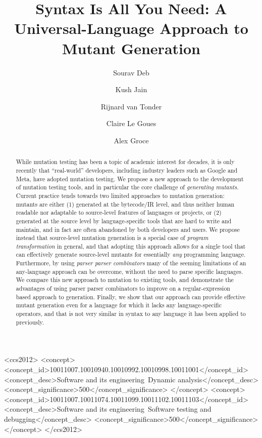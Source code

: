 \documentclass[acmsmall]{acmart}
\title{Syntax Is All You Need: A Universal-Language Approach to Mutant Generation}
\author{Sourav Deb}
\affiliation{\institution{Northern Arizona University}
  \city{Flagstaff, AZ}
\country{United States}}
\author{Kush Jain}
\affiliation{\institution{Carnegie Mellon University}
  \city{Pittsburgh, PA}
\country{United States}}
\author{Rijnard van Tonder}
\affiliation{\institution{Mysten Labs}
  \city{Palo Alto, CA}
\country{United States}}
\author{Claire Le Goues}
\affiliation{\institution{Carnegie Mellon University}
  \city{Pittsburgh, PA}  
\country{United States}}
\author{Alex Groce}
\affiliation{\institution{Northern Arizona University}
  \city{Flagstaff, AZ}
\country{United States}}
\begin{document}

\renewcommand{\shortauthors}{Trovato et al.}

\begin{abstract}
  While mutation testing has been a topic of academic interest for
decades, it is only recently that ``real-world'' developers, including
industry leaders such as Google and Meta, have adopted mutation
testing.  We propose a new approach to the development of mutation
testing tools, and in particular the core challenge of
\emph{generating mutants}.  Current practice tends towards two
limited approaches to mutation generation: mutants are either (1)
generated at the bytecode/IR level, and thus neither human readable
nor adaptable to source-level features of languages or projects, or
(2) generated at the source level by language-specific tools that are
hard to write and maintain, and in fact are often abandoned by both
developers and users.  We propose instead that source-level mutation
generation is a special case of \emph{program transformation} in
general, and that adopting this approach allows for a single tool that
can effectively generate source-level mutants for essentially
\emph{any} programming language. Furthermore, by using \emph{parser
  parser combinators} many of the seeming limitations of an
any-language approach can be overcome, without the need to parse
specific languages.  We compare this new
approach to mutation to existing tools, and demonstrate the advantages
of using parser parser combinators to improve on a regular-expression
based approach to generation.  Finally, we show that our approach
can provide effective mutant generation even for a language for which
it lacks any language-specific operators, and that is not very similar
in syntax to any language it has been applied to previously.
\end{abstract}

\begin{CCSXML}
<ccs2012>
<concept>
<concept_id>10011007.10010940.10010992.10010998.10011001</concept_id>
<concept_desc>Software and its engineering~Dynamic analysis</concept_desc>
<concept_significance>500</concept_significance>
</concept>
<concept>
<concept_id>10011007.10011074.10011099.10011102.10011103</concept_id>
<concept_desc>Software and its engineering~Software testing and debugging</concept_desc>
<concept_significance>500</concept_significance>
</concept>
</ccs2012>
\end{CCSXML}
\end{document}
